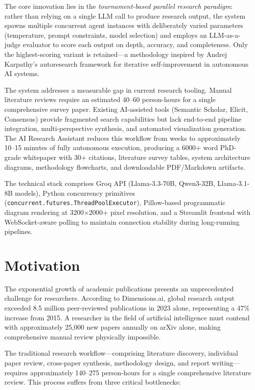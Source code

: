 \documentclass[a4paper,12pt,openany]{report}
\begin{document}
The core innovation lies in the \textit{tournament-based parallel research paradigm}: rather than relying on a single LLM call to produce research output, the system spawns multiple concurrent agent instances with deliberately varied parameters (temperature, prompt constraints, model selection) and employs an LLM-as-a-judge evaluator to score each output on depth, accuracy, and completeness. Only the highest-scoring variant is retained---a methodology inspired by Andrej Karpathy's autoresearch framework for iterative self-improvement in autonomous AI systems.

The system addresses a measurable gap in current research tooling. Manual literature reviews require an estimated 40--60 person-hours for a single comprehensive survey paper. Existing AI-assisted tools (Semantic Scholar, Elicit, Consensus) provide fragmented search capabilities but lack end-to-end pipeline integration, multi-perspective synthesis, and automated visualization generation. The AI Research Assistant reduces this workflow from weeks to approximately 10--15 minutes of fully autonomous execution, producing a 6000+ word PhD-grade whitepaper with 30+ citations, literature survey tables, system architecture diagrams, methodology flowcharts, and downloadable PDF/Markdown artifacts.

The technical stack comprises Groq API (Llama-3.3-70B, Qwen3-32B, Llama-3.1-8B models), Python concurrency primitives (\texttt{concurrent.futures.ThreadPoolExecutor}), Pillow-based programmatic diagram rendering at 3200$\times$2000+ pixel resolution, and a Streamlit frontend with WebSocket-aware polling to maintain connection stability during long-running pipelines.

\section{Motivation}

The exponential growth of academic publications presents an unprecedented challenge for researchers. According to Dimensions.ai, global research output exceeded 8.5 million peer-reviewed publications in 2023 alone, representing a 47\% increase from 2015. A researcher in the field of artificial intelligence must contend with approximately 25,000 new papers annually on arXiv alone, making comprehensive manual review physically impossible.

The traditional research workflow---comprising literature discovery, individual paper review, cross-paper synthesis, methodology design, and report writing---requires approximately 140--275 person-hours for a single comprehensive literature review. This process suffers from three critical bottlenecks:
\end{document}
